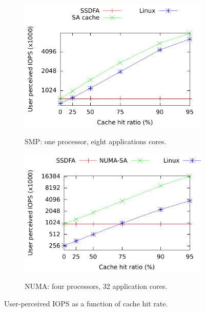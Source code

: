 \begin{figure}[tb]
\centering
\footnotesize
\vspace{-15pt}
\begin{subfigure}{.5\textwidth}
	\includegraphics{figs/SAFS/new-SA-cache-hits.pdf}
	\label{sa_cache}
\vspace{-15pt}
\caption{SMP: one processor, eight applications cores.}
\end{subfigure}

\begin{subfigure}{.5\textwidth}
	\includegraphics{figs/SAFS/new-NUMA-SA-hits.pdf}
	\label{numa_cache}
\vspace{-15pt}
\caption{NUMA: four processors, 32 application cores.}
\end{subfigure}
\caption{User-perceived IOPS as a function of cache hit rate.}
\label{SA_iops}
\end{figure}


